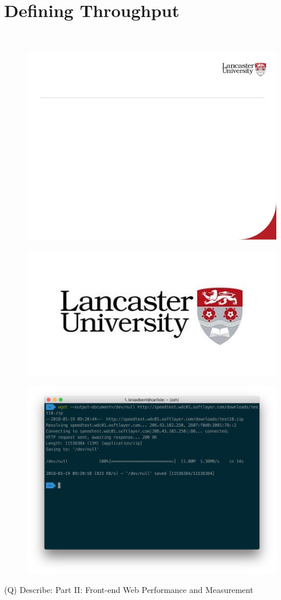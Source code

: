 \documentclass[12pt]{article}
\begin{document}
\section{Defining Throughput}
\\
\begin{figure}[H]
\includegraphics[width=0.5\linewidth]{page30-image-1.png}
\end{figure}
\begin{figure}[H]
\includegraphics[width=0.5\linewidth]{page30-image-2.png}
\end{figure}
\begin{figure}[H]
\includegraphics[width=0.5\linewidth]{page30-image-3.png}
\end{figure}
\clearpage
(Q)
Describe: Part II: Front-end Web Performance and Measurement
\clearpage
\end{document}
